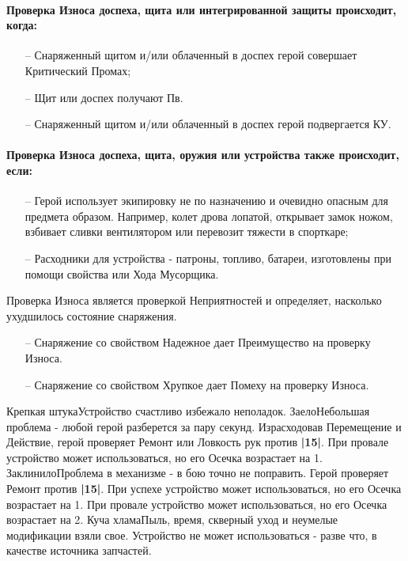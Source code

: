 \paragraph{Проверка Износа доспеха, щита или интегрированной защиты происходит, когда:}
\begin{itemize}
    \item[--] Снаряженный щитом и/или облаченный в доспех герой совершает Критический Промах;
    \item[--] Щит или доспех получают Пв.
    \item[--] Снаряженный щитом и/или облаченный в доспех герой подвергается КУ.
\end{itemize}
\paragraph{Проверка Износа доспеха, щита, оружия или устройства также происходит, если:}
\begin{itemize}
    \item[--] Герой использует экипировку не по назначению и очевидно опасным для предмета образом. Например, колет дрова лопатой, открывает замок ножом, взбивает сливки вентилятором или перевозит тяжести в спорткаре;
    \item[--] Расходники для устройства - патроны, топливо, батареи, изготовлены при помощи свойства или Хода Мусорщика.
\end{itemize}
Проверка Износа является проверкой Неприятностей и определяет, насколько ухудшилось состояние снаряжения.
\begin{itemize}
    \item[--] Снаряжение со свойством Надежное дает Преимущество на проверку Износа.
    \item[--] Снаряжение со свойством Хрупкое дает Помеху на проверку Износа.
\end{itemize}

\trouble
{Крепкая штука}{Устройство счастливо избежало неполадок.}
{Заело}{Небольшая проблема - любой герой разберется за пару секунд. Израсходовав Перемещение и Действие, герой проверяет Ремонт или Ловкость рук против \textbf{|15|}. При провале устройство может использоваться, но его Осечка возрастает на 1.}
{Заклинило}{Проблема в механизме - в бою точно не поправить. Герой проверяет Ремонт против \textbf{|15|}. При успехе устройство может использоваться, но его Осечка возрастает на 1. При провале устройство может использоваться, но его Осечка возрастает на 2. }
{Куча хлама}{Пыль, время, скверный уход и неумелые модификации взяли свое. Устройство не может использоваться - разве что, в качестве источника запчастей.}

